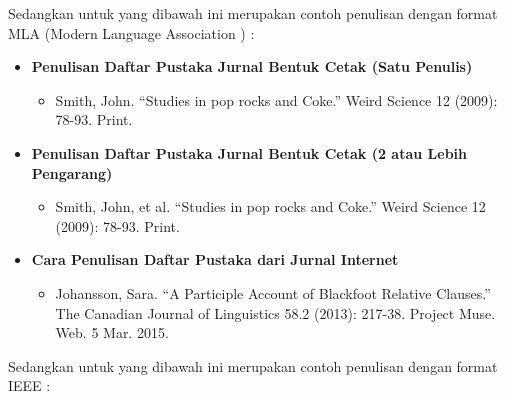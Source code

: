 \documentclass{article}
\begin{document}
Sedangkan untuk yang dibawah ini merupakan contoh penulisan dengan format MLA (Modern Language Association )\cite{salamadian} : 

\begin{itemize}
    \item \textbf{Penulisan Daftar Pustaka Jurnal Bentuk Cetak (Satu Penulis)}
    \begin{itemize}
        \item Smith, John. “Studies in pop rocks and Coke.” Weird Science 12 (2009): 78-93. Print.
    \end{itemize}
    \item \textbf{Penulisan Daftar Pustaka Jurnal Bentuk Cetak (2 atau Lebih Pengarang)}
    \begin{itemize}
        \item Smith, John, et al. “Studies in pop rocks and Coke.” Weird Science 12 (2009): 78-93. Print.        
    \end{itemize}
    \item \textbf{Cara Penulisan Daftar Pustaka dari Jurnal Internet}
    \begin{itemize}
        \item Johansson, Sara. “A Participle Account of Blackfoot Relative Clauses.” The Canadian Journal of Linguistics 58.2 (2013): 217-38. Project Muse. Web. 5 Mar. 2015.
    \end{itemize}
\end{itemize}


Sedangkan untuk yang dibawah ini merupakan contoh penulisan dengan format IEEE : 
\end{document}

